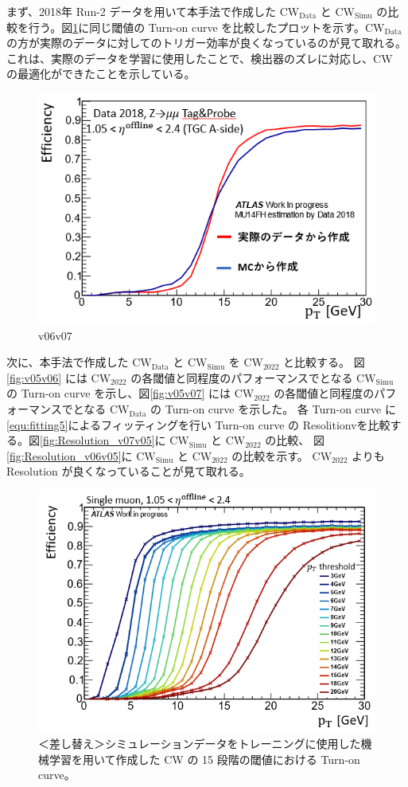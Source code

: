 まず、2018年 Run-2 データを用いて本手法で作成した $\mathrm{CW_{Data}}$ と $\mathrm{CW_{Simu}}$ の比較を行う。図\ref{fig:v06v07}に同じ閾値の Turn-on curve を比較したプロットを示す。$\mathrm{CW_{Data}}$ の方が実際のデータに対してのトリガー効率が良くなっているのが見て取れる。これは、実際のデータを学習に使用したことで、検出器のズレに対応し、CW の最適化ができたことを示している。
\begin{figure}[tb]
  \centering
  \includegraphics[clip, width=12cm]{fig/4/hikaku_v06_v07.png}
  \caption{v06v07}
  \label{fig:v06v07}
\end{figure}

次に、本手法で作成した $\mathrm{CW_{Data}}$ と $\mathrm{CW_{Simu}}$ を $\mathrm{CW_{2022}}$ と比較する。
図\ref{fig:v05v06} には $\mathrm{CW_{2022}}$ の各閾値と同程度のパフォーマンスでとなる $\mathrm{CW_{Simu}}$ の Turn-on curve を示し、図\ref{fig:v05v07} には $\mathrm{CW_{2022}}$ の各閾値と同程度のパフォーマンスでとなる $\mathrm{CW_{Data}}$ の Turn-on curve を示した。
各 Turn-on curve に\eqref{equ:fitting5}によるフィッティングを行い Turn-on curve の Resolitionvを比較する。図\ref{fig:Resolution_v07v05}に $\mathrm{CW_{Simu}}$ と $\mathrm{CW_{2022}}$ の比較、 図\ref{fig:Resolution_v06v05}に $\mathrm{CW_{Simu}}$ と $\mathrm{CW_{2022}}$ の比較を示す。
$\mathrm{CW_{2022}}$ よりも Resolution が良くなっていることが見て取れる。


\begin{figure}[tb]
  \centering
  \includegraphics[clip, width=12cm]{fig/4/v07_15_Eff.png}
  \caption{＜差し替え＞シミュレーションデータをトレーニングに使用した機械学習を用いて作成した CW の 15 段階の閾値における Turn-on curve。}
  \label{fig:15Eff_CW_Simu}
\end{figure}

